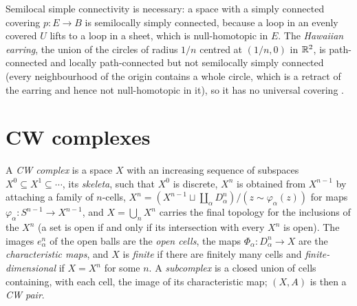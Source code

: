 \begin{counterexample}\label{homotopy:counterexample-hawaiian-earring}
Semilocal simple connectivity is necessary: a space with a simply connected covering $p \colon E \to B$ is semilocally simply connected, because a loop in an evenly
covered $U$ lifts to a loop in a sheet, which is null-homotopic in $E$. The \emph{Hawaiian earring}, the union of the circles of radius $1/n$ centred at $(1/n, 0)$ in
$\mathbb{R}^2$, is path-connected and locally path-connected but not semilocally simply connected (every neighbourhood of the origin contains a whole circle, which is a
retract of the earring and hence not null-homotopic in it), so it has no universal covering \cite{hatcher-at}.
\end{counterexample}

\section{CW complexes}\label{homotopy:section-cw}

\begin{definition}\label{homotopy:definition-cw}
A \emph{CW complex} is a space $X$ with an increasing sequence of subspaces $X^0 \subseteq X^1 \subseteq \cdots$, its \emph{skeleta}, such that $X^0$ is discrete,
$X^n$ is obtained from $X^{n-1}$ by attaching a family of $n$-cells, $X^n = (X^{n-1} \sqcup \coprod_\alpha D^n_\alpha)/(z \sim \varphi_\alpha(z))$ for maps
$\varphi_\alpha \colon S^{n-1} \to X^{n-1}$, and $X = \bigcup_n X^n$ carries the final topology for the inclusions of the $X^n$ (a set is open if and only if its
intersection with every $X^n$ is open). The images $e^n_\alpha$ of the open balls are the \emph{open cells}, the maps $\Phi_\alpha \colon D^n_\alpha \to X$ are the
\emph{characteristic maps}, and $X$ is \emph{finite} if there are finitely many cells and \emph{finite-dimensional} if $X = X^n$ for some $n$. A \emph{subcomplex}
is a closed union of cells containing, with each cell, the image of its characteristic map; $(X, A)$ is then a \emph{CW pair}.
\end{definition}

